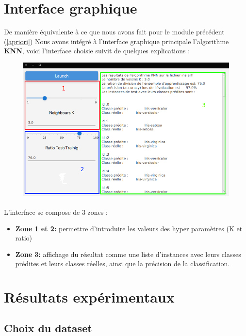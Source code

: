 	\section{Interface graphique}
		\paragraph{}
		De manière équivalente à ce que nous avons fait pour le module précédent (\ref{apriori}) Nous avons intégré à l'interface graphique principale l'algorithme \textbf{KNN}, voici l'interface choisie suivit de quelques explications : 
		\begin{figure}[H]
			\centering
			\includegraphics[width=0.75\linewidth]{knn/images/app.png}
		\end{figure}
		\paragraph{}
		L'interface se compose de 3 zones :
		\begin{itemize}
			\item \textbf{Zone 1 et 2:} permettre d'introduire les valeurs des hyper paramètres (K et ratio)
			\item \textbf{Zone 3:} affichage du résultat comme une liste d'instances avec leurs classes prédites et leurs classes réelles, ainsi que la précision de la classification. 
		\end{itemize}
	
	\section{Résultats expérimentaux}
		\subsection{Choix du dataset}
